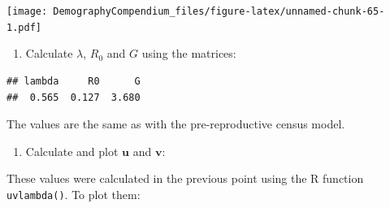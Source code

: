 \documentclass[
]{book}
\newenvironment{Shaded}{\begin{snugshade}}{\end{snugshade}}
\newcommand{\CommentTok}[1]{\textcolor[rgb]{0.56,0.35,0.01}{\textit{#1}}}
\newcommand{\DecValTok}[1]{\textcolor[rgb]{0.00,0.00,0.81}{#1}}
\newcommand{\FunctionTok}[1]{\textcolor[rgb]{0.00,0.00,0.00}{#1}}
\newcommand{\NormalTok}[1]{#1}
\newcommand{\OtherTok}[1]{\textcolor[rgb]{0.56,0.35,0.01}{#1}}
\newcommand{\SpecialCharTok}[1]{\textcolor[rgb]{0.00,0.00,0.00}{#1}}
\newcommand{\StringTok}[1]{\textcolor[rgb]{0.31,0.60,0.02}{#1}}
\providecommand{\tightlist}{%
  \setlength{\itemsep}{0pt}\setlength{\parskip}{0pt}}
\begin{document}
\texttt{[image: DemographyCompendium\_files/figure-latex/unnamed-chunk-65-1.pdf]}

\begin{enumerate}
\def\labelenumi{\arabic{enumi}.}
\setcounter{enumi}{4}
\tightlist
\item
  Calculate \(\lambda\), \(R_0\) and \(G\) using the matrices:
\end{enumerate}

\begin{Shaded}
\end{Shaded}

\begin{verbatim}
## lambda     R0      G 
##  0.565  0.127  3.680
\end{verbatim}

The values are the same as with the pre-reproductive census model.

\begin{enumerate}
\def\labelenumi{\arabic{enumi}.}
\setcounter{enumi}{5}
\tightlist
\item
  Calculate and plot \(\mathbf{u}\) and \(\mathbf{v}\):
\end{enumerate}

These values were calculated in the previous point using the R function \texttt{uvlambda()}. To plot them:
\end{document}
